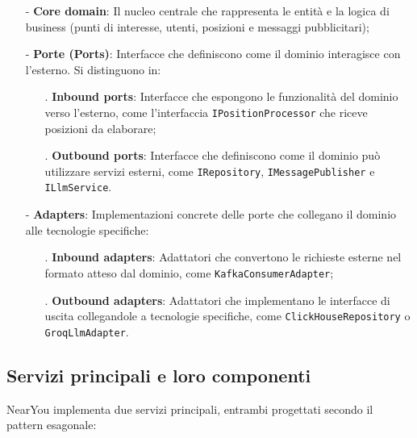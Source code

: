 \documentclass[10pt]{article}
\begin{document}
    \begin{itemize}
        \item[-] \textbf{Core domain}: Il nucleo centrale che rappresenta le entità e la logica di business (punti di interesse, utenti, posizioni e messaggi pubblicitari);
        \item[-] \textbf{Porte (Ports)}: Interfacce che definiscono come il dominio interagisce con l'esterno. Si distinguono in:
        \begin{itemize}
            \item[.] \textbf{Inbound ports}: Interfacce che espongono le funzionalità del dominio verso l'esterno, come l'interfaccia \texttt{IPositionProcessor} che riceve posizioni da elaborare;
            \item[.] \textbf{Outbound ports}: Interfacce che definiscono come il dominio può utilizzare servizi esterni, come \texttt{IRepository}, \texttt{IMessagePublisher} e \texttt{ILlmService}.
        \end{itemize}
        \item[-] \textbf{Adapters}: Implementazioni concrete delle porte che collegano il dominio alle tecnologie specifiche:
        \begin{itemize}
            \item[.] \textbf{Inbound adapters}: Adattatori che convertono le richieste esterne nel formato atteso dal dominio, come \texttt{KafkaConsumerAdapter};
            \item[.] \textbf{Outbound adapters}: Adattatori che implementano le interfacce di uscita collegandole a tecnologie specifiche, come \texttt{ClickHouseRepository} o \texttt{GroqLlmAdapter}.
        \end{itemize}
    \end{itemize}

    \subsection{Servizi principali e loro componenti}
    
    NearYou implementa due servizi principali, entrambi progettati secondo il pattern esagonale:
\end{document}
